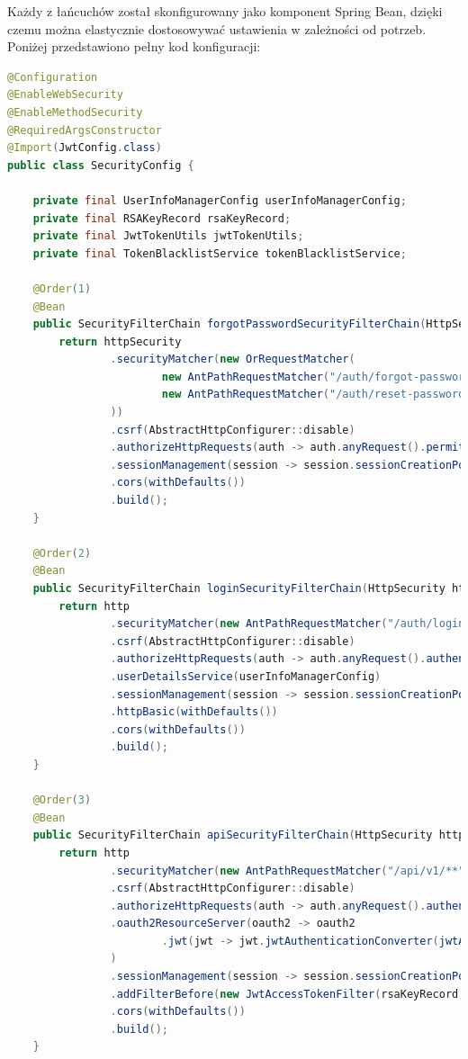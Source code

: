 Każdy z łańcuchów został skonfigurowany jako komponent Spring Bean, dzięki czemu można elastycznie dostosowywać ustawienia w zależności od potrzeb. Poniżej przedstawiono pełny kod konfiguracji:

\begin{lstlisting}[language=Java, caption=Pełna konfiguracja łańcucha filtrów bezpieczeństwa]
@Configuration
@EnableWebSecurity
@EnableMethodSecurity
@RequiredArgsConstructor
@Import(JwtConfig.class)
public class SecurityConfig {

    private final UserInfoManagerConfig userInfoManagerConfig;
    private final RSAKeyRecord rsaKeyRecord;
    private final JwtTokenUtils jwtTokenUtils;
    private final TokenBlacklistService tokenBlacklistService;

    @Order(1)
    @Bean
    public SecurityFilterChain forgotPasswordSecurityFilterChain(HttpSecurity httpSecurity) throws Exception {
        return httpSecurity
                .securityMatcher(new OrRequestMatcher(
                        new AntPathRequestMatcher("/auth/forgot-password"),
                        new AntPathRequestMatcher("/auth/reset-password")
                ))
                .csrf(AbstractHttpConfigurer::disable)
                .authorizeHttpRequests(auth -> auth.anyRequest().permitAll())
                .sessionManagement(session -> session.sessionCreationPolicy(SessionCreationPolicy.STATELESS))
                .cors(withDefaults())
                .build();
    }

    @Order(2)
    @Bean
    public SecurityFilterChain loginSecurityFilterChain(HttpSecurity http) throws Exception {
        return http
                .securityMatcher(new AntPathRequestMatcher("/auth/login"))
                .csrf(AbstractHttpConfigurer::disable)
                .authorizeHttpRequests(auth -> auth.anyRequest().authenticated())
                .userDetailsService(userInfoManagerConfig)
                .sessionManagement(session -> session.sessionCreationPolicy(SessionCreationPolicy.STATELESS))
                .httpBasic(withDefaults())
                .cors(withDefaults())
                .build();
    }

    @Order(3)
    @Bean
    public SecurityFilterChain apiSecurityFilterChain(HttpSecurity http) throws Exception {
        return http
                .securityMatcher(new AntPathRequestMatcher("/api/v1/**"))
                .csrf(AbstractHttpConfigurer::disable)
                .authorizeHttpRequests(auth -> auth.anyRequest().authenticated())
                .oauth2ResourceServer(oauth2 -> oauth2
                        .jwt(jwt -> jwt.jwtAuthenticationConverter(jwtAuthenticationConverter()))
                )
                .sessionManagement(session -> session.sessionCreationPolicy(SessionCreationPolicy.STATELESS))
                .addFilterBefore(new JwtAccessTokenFilter(rsaKeyRecord, jwtTokenUtils, tokenBlacklistService), UsernamePasswordAuthenticationFilter.class)
                .cors(withDefaults())
                .build();
    }


\end{lstlisting}

